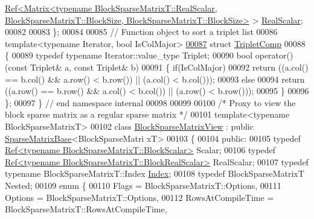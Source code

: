 \begin{DoxyCode}
      \hyperlink{group___core___module_class_eigen_1_1_ref}{Ref<Matrix<typename BlockSparseMatrixT::RealScalar, BlockSparseMatrixT::BlockSize,
       BlockSparseMatrixT::BlockSize>}
       > \hyperlink{group___core___module_class_eigen_1_1_ref}{RealScalar};
00082 
00083 \};
00084 
00085 \textcolor{comment}{// Function object to sort a triplet list}
00086 \textcolor{keyword}{template}<\textcolor{keyword}{typename} Iterator, \textcolor{keywordtype}{bool} IsColMajor>
\hyperlink{struct_eigen_1_1internal_1_1_triplet_comp}{00087} \textcolor{keyword}{struct }\hyperlink{struct_eigen_1_1internal_1_1_triplet_comp}{TripletComp}
00088 \{
00089   \textcolor{keyword}{typedef} \textcolor{keyword}{typename} Iterator::value\_type Triplet;
00090   \textcolor{keywordtype}{bool} operator()(\textcolor{keyword}{const} Triplet& a, \textcolor{keyword}{const} Triplet& b)
00091   \{ \textcolor{keywordflow}{if}(IsColMajor)
00092       \textcolor{keywordflow}{return} ((a.col() == b.col() && a.row() < b.row()) || (a.col() < b.col()));
00093     \textcolor{keywordflow}{else}
00094       \textcolor{keywordflow}{return} ((a.row() == b.row() && a.col() < b.col()) || (a.row() < b.row()));
00095   \}
00096 \};
00097 \} \textcolor{comment}{// end namespace internal}
00098 
00099 
00100 \textcolor{comment}{/* Proxy to view the block sparse matrix as a regular sparse matrix */}
00101 \textcolor{keyword}{template}<\textcolor{keyword}{typename} BlockSparseMatrixT>
00102 \textcolor{keyword}{class }\hyperlink{class_eigen_1_1_block_sparse_matrix_view}{BlockSparseMatrixView} : \textcolor{keyword}{public} \hyperlink{group___sparse_core___module_class_eigen_1_1_sparse_matrix_base}{SparseMatrixBase}<BlockSparseMatri
      xT>
00103 \{
00104   \textcolor{keyword}{public}:
00105     \textcolor{keyword}{typedef} \hyperlink{group___core___module_class_eigen_1_1_ref}{Ref<typename BlockSparseMatrixT::BlockScalar>} 
      Scalar;
00106     \textcolor{keyword}{typedef} \hyperlink{group___core___module_class_eigen_1_1_ref}{Ref<typename BlockSparseMatrixT::BlockRealScalar>}
       RealScalar;
00107     \textcolor{keyword}{typedef} \textcolor{keyword}{typename} BlockSparseMatrixT::Index \hyperlink{namespace_eigen_a62e77e0933482dafde8fe197d9a2cfde}{Index};
00108     \textcolor{keyword}{typedef}  BlockSparseMatrixT Nested;
00109     \textcolor{keyword}{enum} \{
00110       Flags = BlockSparseMatrixT::Options,
00111       Options = BlockSparseMatrixT::Options,
00112       RowsAtCompileTime = BlockSparseMatrixT::RowsAtCompileTime,

\end{DoxyCode}
